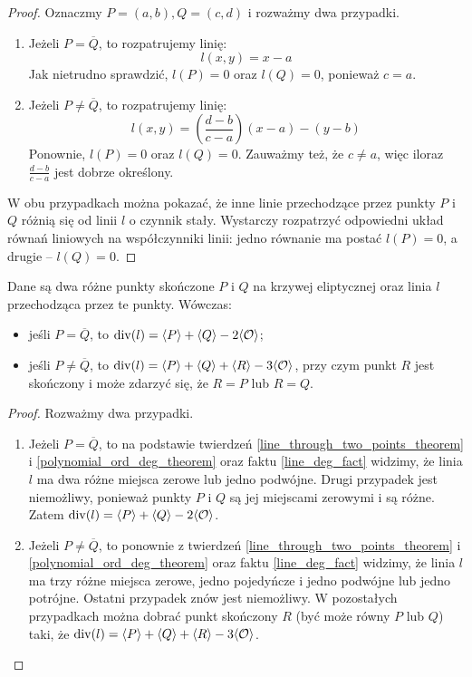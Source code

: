 \begin{proof}
Oznaczmy $P = (a, b), Q = (c, d)$ i rozważmy dwa przypadki.
\begin{enumerate}
\item
Jeżeli $P = \overline{Q}$,
to rozpatrujemy linię:
\begin{equation}
l(x, y) = x - a
\end{equation}
Jak nietrudno sprawdzić, $l(P) = 0$ oraz $l(Q) = 0$,
ponieważ $c = a$.
\item
Jeżeli $P \neq \overline{Q}$,
to rozpatrujemy linię:
\begin{equation}
l(x, y) = \left(\frac{d-b}{c-a}\right)(x - a) - (y - b)
\end{equation}
Ponownie, $l(P) = 0$ oraz $l(Q) = 0$.
Zauważmy też, że $c \neq a$,
więc iloraz $\frac{d-b}{c-a}$ jest dobrze określony.
\end{enumerate}
W obu przypadkach można pokazać, że inne linie
przechodzące przez punkty $P$ i $Q$ różnią się od linii $l$ o czynnik stały.
Wystarczy rozpatrzyć odpowiedni układ równań liniowych
na współczynniki linii: jedno równanie ma postać $l(P) = 0$,
a drugie -- $l(Q) = 0$.
\end{proof}

\begin{theorem}
Dane są dwa różne punkty skończone $P$ i $Q$ na krzywej eliptycznej
oraz linia $l$ przechodząca przez te punkty.
Wówczas:
\begin{itemize}
\item jeśli $P = \overline{Q}$,
to $\operatorname{div}(l) = \langle P\rangle + \langle Q\rangle - 2\langle\mathcal{O}\rangle$;
\item jeśli $P \neq \overline{Q}$,
to $\operatorname{div}(l) = \langle P\rangle + \langle Q\rangle + \langle R\rangle - 3\langle\mathcal{O}\rangle$,
przy czym punkt $R$ jest skończony
i może zdarzyć się, że $R = P$ lub $R = Q$.
\end{itemize}
\end{theorem}

\begin{proof}
Rozważmy dwa przypadki.
\begin{enumerate}
\item
Jeżeli $P = \overline{Q}$,
to na podstawie twierdzeń
\ref{line_through_two_points_theorem} i \ref{polynomial_ord_deg_theorem}
oraz faktu \ref{line_deg_fact} widzimy,
że linia $l$ ma dwa różne miejsca zerowe lub jedno podwójne.
Drugi przypadek jest niemożliwy,
ponieważ punkty $P$ i $Q$ są jej miejscami zerowymi i są różne.
Zatem $\operatorname{div}(l) = \langle P\rangle + \langle Q\rangle - 2\langle\mathcal{O}\rangle$.
\item
Jeżeli $P \neq \overline{Q}$,
to ponownie z twierdzeń
\ref{line_through_two_points_theorem} i \ref{polynomial_ord_deg_theorem}
oraz faktu \ref{line_deg_fact} widzimy,
że linia $l$ ma trzy różne miejsca zerowe, jedno pojedyńcze i jedno podwójne
lub jedno potrójne.
Ostatni przypadek znów jest niemożliwy.
W pozostałych przypadkach można dobrać punkt skończony $R$
(być może równy $P$ lub $Q$) taki,
że $\operatorname{div}(l) = \langle P\rangle + \langle Q\rangle + \langle R\rangle - 3\langle\mathcal{O}\rangle$.
\end{enumerate}
\end{proof}

